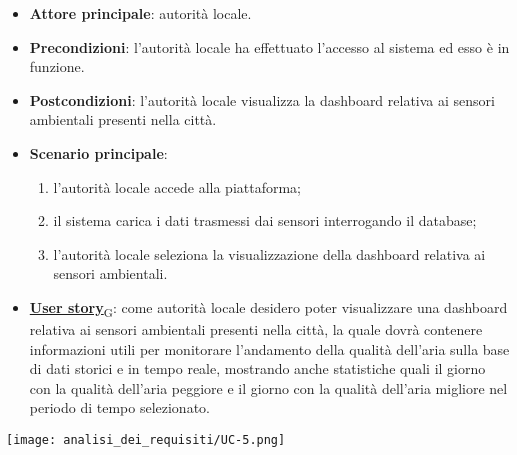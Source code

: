 \begin{itemize}
	\item \textbf{Attore principale}: autorità locale.
	\item \textbf{Precondizioni}: l'autorità locale ha effettuato l'accesso al sistema ed esso è in funzione.
	\item \textbf{Postcondizioni}: l'autorità locale visualizza la dashboard relativa
	      ai sensori ambientali presenti nella città.
	\item \textbf{Scenario principale}:
	      \begin{enumerate}
		      \item l'autorità locale accede alla piattaforma;
		      \item il sistema carica i dati trasmessi dai sensori interrogando il database;
		      \item l'autorità locale seleziona la visualizzazione della dashboard relativa ai sensori ambientali.
	      \end{enumerate}
	\item \href{https://7last.github.io/docs/pb/documentazione-interna/glossario\#user-story}{\textbf{User story}\textsubscript{G}}:
	      come autorità locale desidero poter visualizzare una dashboard relativa ai sensori ambientali presenti nella città, la quale
	      dovrà contenere informazioni utili per monitorare l'andamento della qualità dell'aria sulla base di dati storici e in tempo reale, mostrando
	      anche statistiche quali il giorno con la qualità dell'aria peggiore e il giorno con la qualità dell'aria migliore nel periodo di tempo selezionato.
\end{itemize}
\begin{center}
	\texttt{[image: analisi\_dei\_requisiti/UC-5.png]}
\end{center}



